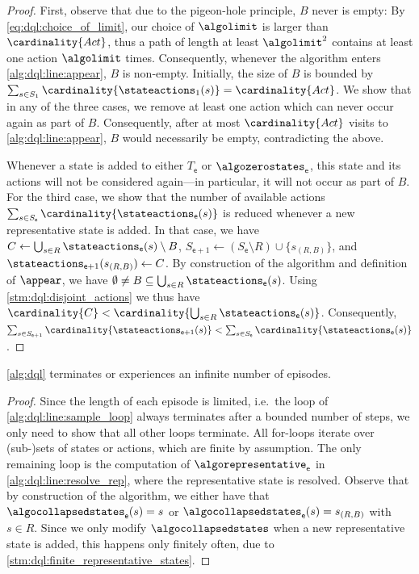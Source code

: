 \documentclass{article}
\newcommand{\unionSym}{\cup}
\newcommand{\unionBin}{\mathbin{\unionSym}}
\newcommand{\UnionSym}{\bigcup}
\newcommand{\union}{\unionBin}
\newcommand{\Union}{\UnionSym}
\newcommand{\States}{S}
\newcommand{\Actions}{Act}
\newcommand{\targetset}{T}
\newcommand{\algoepisode}{\mathsf{e}}
\begin{document}
\begin{proof}
	First, observe that due to the pigeon-hole principle, $B$ never is empty:
	By \eqref{eq:dql:choice_of_limit}, our choice of $\algolimit$ is larger than $\cardinality{\Actions}$, thus a path of length at least $\algolimit^2$ contains at least one action $\algolimit$ times.
	Consequently, whenever the algorithm enters \cref{alg:dql:line:appear}, $B$ is non-empty.
	Initially, the size of $B$ is bounded by $\sum_{s \in \States_1} \cardinality{\stateactions_1(s)} = \cardinality{\Actions}$.
	We show that in any of the three cases, we remove at least one action which can never occur again as part of $B$.
	Consequently, after at most $\cardinality{\Actions}$ visits to \cref{alg:dql:line:appear}, $B$ would necessarily be empty, contradicting the above.

	Whenever a state is added to either $\targetset_\algoepisode$ or $\algozerostates_\algoepisode$, this state and its actions will not be considered again---in particular, it will not occur as part of $B$.
	For the third case, we show that the number of available actions $\sum_{s \in \States_\algoepisode} \cardinality{\stateactions_{\algoepisode}(s)}$ is reduced whenever a new representative state is added.
	In that case, we have $C \gets \Union_{s \in R} \stateactions_{\algoepisode}(s) \setminus B$, $\States_{\algoepisode + 1} \gets (\States_\algoepisode  \setminus R) \union \{s_{(R, B)}\}$, and $\stateactions_{\algoepisode + 1}(s_{(R, B)}) \gets C$.
	By construction of the algorithm and definition of $\appear$, we have $\emptyset \neq B \subseteq \Union_{s \in R} \stateactions_\algoepisode(s)$.
	Using \cref{stm:dql:disjoint_actions} we thus have $\cardinality{C} < \cardinality{\Union_{s \in R} \stateactions_\algoepisode(s)}$.
	Consequently, $\sum_{s \in \States_{\algoepisode + 1}} \cardinality{\stateactions_{\algoepisode + 1}(s)} < \sum_{s \in \States_\algoepisode} \cardinality{\stateactions_{\algoepisode}(s)}$.\end{proof}

\begin{lemma} \label{stm:dql:terminate_or_infinite_episodes}
	\cref{alg:dql} terminates or experiences an infinite number of episodes.
\end{lemma}

\begin{proof}
	Since the length of each episode is limited, i.e.\ the loop of \cref{alg:dql:line:sample_loop} always terminates after a bounded number of steps, we only need to show that all other loops terminate.
	All for-loops iterate over (sub-)sets of states or actions, which are finite by assumption.
	The only remaining loop is the computation of $\algorepresentative_\algoepisode$ in \cref{alg:dql:line:resolve_rep}, where the representative state is resolved.
	Observe that by construction of the algorithm, we either have that $\algocollapsedstates_\algoepisode(s) = s$ or $\algocollapsedstates_\algoepisode(s) = s_{(R, B)}$ with $s \in R$.
	Since we only modify $\algocollapsedstates$ when a new representative state is added, this happens only finitely often, due to \cref{stm:dql:finite_representative_states}. 
\end{proof}
\end{document}
